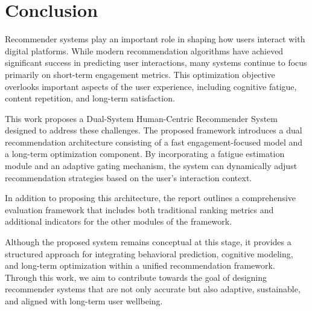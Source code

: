 \section{Conclusion}

Recommender systems play an important role in shaping how users interact with digital platforms.
While modern recommendation algorithms have achieved significant success in predicting user interactions, 
many systems continue to focus primarily on short-term engagement metrics.
This optimization objective overlooks important aspects of the user experience, including cognitive fatigue, content repetition, and long-term satisfaction.

This work proposes a Dual-System Human-Centric Recommender System designed to address these challenges.
The proposed framework introduces a dual recommendation architecture consisting of a fast engagement-focused model and a long-term optimization component.
By incorporating a fatigue estimation module and an adaptive gating mechanism, 
the system can dynamically adjust recommendation strategies based on the user's interaction context.

In addition to proposing this architecture, the report outlines a comprehensive evaluation framework that includes both
traditional ranking metrics and additional indicators for the other modules of the framework.

Although the proposed system remains conceptual at this stage, it provides a structured approach for integrating 
behavioral prediction, cognitive modeling, and long-term optimization within a unified recommendation framework.
Through this work, we aim to contribute towards the goal of designing recommender systems that 
are not only accurate but also adaptive, sustainable, and aligned with long-term user wellbeing.
